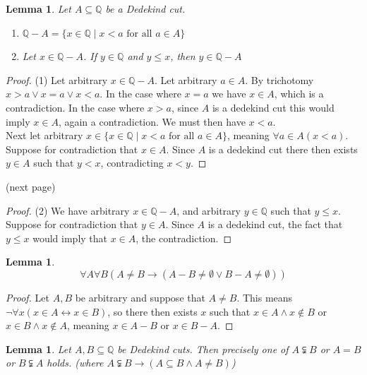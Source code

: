 \documentclass{report}
\newtheorem{lemma}[theo]{Lemma}
\begin{document}
\begin{lemma}\label{ded_1}
Let $A\subseteq\mathbb Q$ be a Dedekind cut.
\begin{enumerate}
\item $\mathbb Q-A=\{x\in\mathbb Q\mid x<a\text{ for all }a\in A\}$
\item Let $x\in\mathbb Q-A$. If $y\in\mathbb Q$ and $y\leq x$, then $y\in\mathbb Q-A$
\end{enumerate}
\end{lemma}
\begin{proof}(1)
Let arbitrary $x\in\mathbb Q-A$. Let arbitrary $a\in A$. By trichotomy $x>a\lor x=a\lor x<a$. In the case where $x=a$ we have $x\in A$, which is a contradiction. In the
case where $x>a$, since $A$ is a dedekind cut this would imply $x\in A$, again a contradiction. We must then have $x<a$.\\
\indent Next let arbitrary $x\in\{x\in\mathbb Q\mid x<a\text{ for all }a\in A\}$, meaning $\forall a\in A(x<a)$. Suppose for contradiction that $x\in A$. Since $A$ is a dedekind cut there then exists $y\in A$ such
that $y<x$, contradicting $x<y$.\qedhere
\end{proof}
\noindent(next page)\newpage
\begin{proof}(2)
We have arbitrary $x\in\mathbb Q-A$, and arbitrary $y\in\mathbb Q$ such that $y\leq x$. 
Suppose for contradiction that $y\in A$. Since $A$ is a dedekind cut, the fact that $y\leq x$ would imply that $x\in A$, the contradiction.
\end{proof}
\begin{lemma}
\begin{equation*}
\forall A\forall B(A\neq B\to(A-B\neq\emptyset\lor B-A\neq\emptyset))
\end{equation*}
\end{lemma}
\begin{proof}
Let $A,B$ be arbitrary and suppose that $A\neq B$. This means $\neg\forall x(x\in A\leftrightarrow x\in B)$, so there then exists $x$ such that $x\in A\land x\notin B$ or 
$x\in B\land x\notin A$, meaning $x\in A-B$ or $x\in B-A$.
\end{proof}
\begin{lemma}
Let $A,B\subseteq\mathbb Q$ be Dedekind cuts. Then precisely one of $A\subsetneqq B$ or $A=B$ or 
$B\subsetneqq A$ holds. (where $A\subsetneqq B\to(A\subseteq B\land A\neq B)$)
\end{lemma}
\end{document}
